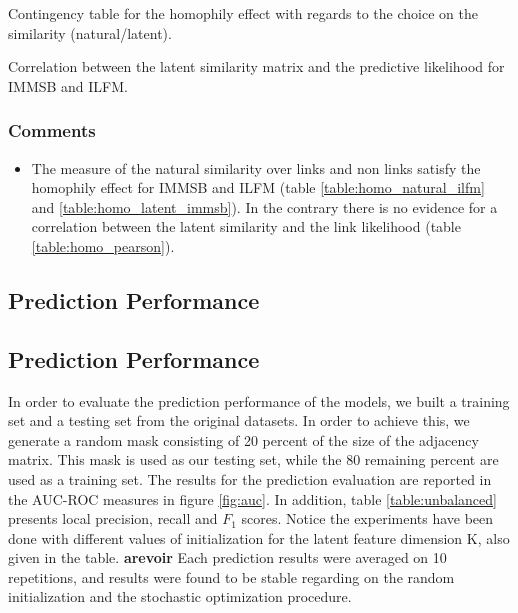 \documentclass[a4paper, 12pt]{article}
\newcommand*{\lpath}{./}%
\begin{document}
\begin{table}
    \caption{Contingency table for the homophily effect with regards to the choice on the similarity (natural/latent).}
\centering


    \label{table:homo_contingency}
\end{table}

\begin{table}[h]
    \caption{Correlation between the latent similarity matrix and the predictive likelihood for IMMSB and ILFM.}
    \centering
    
    \label{table:homo_pearson}
\end{table}


\subsubsection{Comments}
\begin{itemize}
    \item The measure of the natural similarity over links and non links satisfy the homophily effect for IMMSB and ILFM (table \ref{table:homo_natural_ilfm} and \ref{table:homo_latent_immsb}). In the contrary there is no evidence for a correlation between the latent similarity and the link likelihood (table \ref{table:homo_pearson}). 
\end{itemize}


\subsection{Prediction Performance}
\subsection{Prediction Performance}
In order to evaluate the  prediction performance of the models, we built a training set and a testing set from the original datasets. In order to achieve this, we generate a random mask consisting of 20 percent of the size of the adjacency matrix. This mask is used as our testing set, while the 80 remaining percent are used as a training set. The results for the prediction evaluation are reported in  the AUC-ROC measures in figure \ref{fig:auc}. In addition,  table \ref{table:unbalanced} presents local precision, recall and $F_1$ scores.   Notice the experiments have been done with different  values of initialization for the latent feature dimension K, also given in the table.
\textbf{arevoir}
Each prediction results were averaged on 10 repetitions, and results were found to be stable regarding on the random  initialization and the stochastic optimization procedure. 
\end{document}
